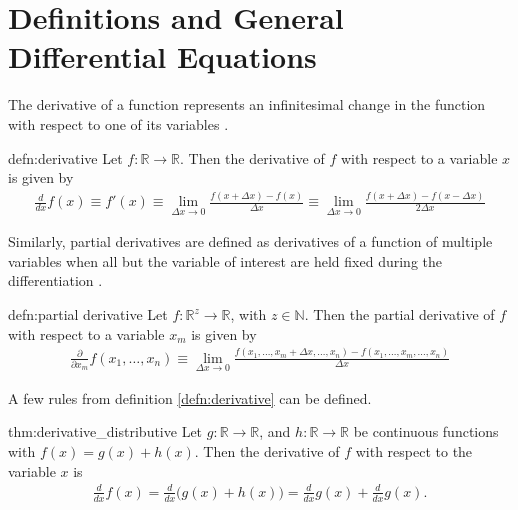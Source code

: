 
\section{Definitions and General Differential Equations}
 The derivative of a function represents an infinitesimal change in the function with respect to one of its variables \cite{bib:Wolfram}. 
\begin{defn}[Derivative]{defn:derivative} 
	Let $f:\mathbb{R}\rightarrow\mathbb{R}$. Then the derivative of $f$ with respect to a variable $x$ is given by
	\begin{align*}
	\frac{d}{dx}f(x)\equiv f'(x) \equiv\lim\limits_{\Delta x \rightarrow 0}\frac{f(x+\Delta x)-f(x)}{\Delta x} \equiv \lim\limits_{\Delta x \rightarrow 0}\frac{f(x+\Delta x)-f(x-\Delta x)}{2\Delta x}
	\end{align*}
\end{defn}
Similarly, partial derivatives are defined as derivatives of a function of multiple variables when all but the variable of interest are held fixed during the differentiation \cite{bib:Wolfram}. 
\begin{defn}{defn:partial derivative}
	Let $f:\mathbb{R}^z\rightarrow\mathbb{R}$, with $z \in \mathbb{N}$. Then the partial derivative of $f$ with respect to a variable $x_m$ is given by
	\begin{align*}
	\frac{\partial}{\partial x_m}f(x_1,\dots,x_n) \equiv \lim\limits_{\Delta x \rightarrow 0}\frac{f(x_1,\dots,x_m+\Delta x, \dots,x_n)-f(x_1,\dots,x_m,\dots,x_n)}{\Delta x}
	\end{align*}
\end{defn}
A few rules from definition \ref{defn:derivative} can be defined.
\begin{theo}{thm:derivative_distributive}
	Let $g:\mathbb{R}\rightarrow\mathbb{R}$, and $h:\mathbb{R}\rightarrow\mathbb{R}$ be continuous functions with $f(x)=g(x)+h(x)$. Then the derivative of $f$ with respect to the variable $x$ is 
	\begin{align*}
	\frac{d}{dx}f(x)=\frac{d}{dx}\big(g(x)+h(x)\big) = \frac{d}{dx}g(x)+\frac{d}{dx}g(x).
	\end{align*} 
\end{theo}

